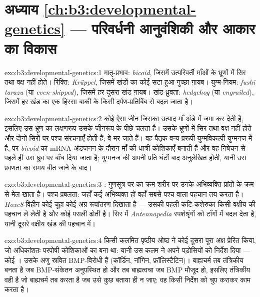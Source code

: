 \section*{अध्याय \ref{ch:b3:developmental-genetics} --- परिवर्धनी आनुवंशिकी और आकार का विकास}

\begin{solution}{exo:b3:developmental-genetics:1}
मातृ-प्रभाव: \emph{bicoid}, जिसमें उत्परिवर्ती माँओं के भ्रूणों में सिर
तथा वक्ष नहीं होते। रिक्ति: \emph{Krüppel}, जिसमें खंडों का कोई सटा
हुआ गुच्छा ग़ायब। युग्म-नियम: \emph{fushi tarazu} (या
\emph{even-skipped}), जिसमें हर दूसरा खंड ग़ायब। खंड-ध्रुवता:
\emph{hedgehog} (या \emph{engrailed}), जिसमें हर खंड का एक हिस्सा बाकी
के किसी दर्पण-प्रतिबिंब से बदल जाता है।
\end{solution}

\begin{solution}{exo:b3:developmental-genetics:2}
कोई ऐसा जीन जिसका उत्पाद माँ अंडे में जमा कर देती है, इसलिए उस भ्रूण
का लक्षणरूप उसके जीनरूप के पीछे चलता है। उसके भ्रूणों में सिर तथा वक्ष
नहीं होते और दोनों सिरों पर पश्च संरचनाएँ होती हैं; वे मर जाते हैं। वह
पैतृक वन्य-प्ररूपी युग्मविकल्पी युग्मनज में है, पर \emph{bicoid} का
mRNA अंडजनन के दौरान माँ की धात्री कोशिकाएँ बनाती हैं और वह निषेचन से
पहले ही उस ध्रुव पर बाँध दिया जाता है; युग्मनज की अपनी प्रति घंटों बाद
अनुलेखित होती, यानी उस प्रवणता का समय बीत जाने के बाद।
\end{solution}

\begin{solution}{exo:b3:developmental-genetics:3}
: गुणसूत्र पर  का क्रम शरीर पर उनके
अभिव्यक्ति-प्रांतों के क्रम से मेल खाता है। पश्च प्रबलता: जहाँ कई
अभिव्यक्त हों वहाँ सबसे पश्च वाला पहचान तय करता है।
\emph{Hoxc8}-विहीन कोई चूहा कोई अग्र रूपांतरण दिखाता है --- उसकी पहली
कटि-कशेरुका किसी वक्षीय की पहचान ले लेती है और कोई पसली ढोती है। सिर
में \emph{Antennapedia} स्पर्शश्रृंगों को टाँगों में बदल देता है, यानी
दूसरे वक्षीय खंड की पहचान में।
\end{solution}

\begin{solution}{exo:b3:developmental-genetics:4}
किसी कलमित पृष्ठीय ओष्ठ ने कोई दूसरा पूरा अक्ष प्रेरित किया, जो
अधिकांशतः परपोषी कोशिकाओं का बना था: यानी उस कलम ने अपने पड़ोसियों को
निर्देश दिया --- कोई । उसके अणु स्रवित BMP-विरोधी हैं (कॉर्डिन,
नॉगिन, फ़ॉलिस्टैटिन)। बाह्यचर्म तब तंत्रिकीय बनता है जब BMP-संकेतन
अनुपस्थित हो और तब बाह्यत्वचा जब BMP मौजूद हो, इसलिए तंत्रिकीय वही है
जो बाह्यचर्म तब करता है जब उसे कुछ बताया ही न जाए: वह  किसी निर्देश
को चुप कराकर काम करता है।
\end{solution}


